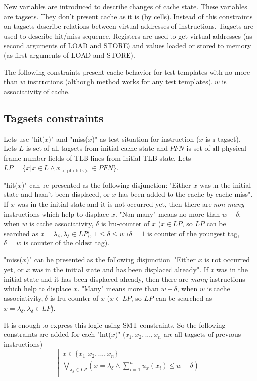 \documentclass[times, 10pt,twocolumn]{article}
\begin{document}
New variables are introduced to describe changes of cache state.
These variables are tagsets. They don't present cache as it is (by
cells). Instead of this constraints on tagsets describe relations
between virtual addresses of instructions. Tagsets are used to
describe hit/miss sequence. Registers are used to get virtual
addresses (as second arguments of LOAD and STORE) and values loaded
or stored to memory (as first arguments of LOAD and STORE).

The following constraints present cache behavior for test templates
with no more than $w$ instructions (although method works for any
test templates). $w$ is associativity of cache.

\subsection{Tagsets constraints}

Lets use "hit($x$)" and "miss($x$)" as test situation for
instruction ($x$ is a tagset). Lets $L$ is set of all tagsets from
initial cache state and $PFN$ is set of all physical frame number
fields of TLB lines from initial TLB state. Lets $LP = \{ x | x \in
L \wedge x_{<\mbox{pfn~bits}>} \in PFN\}$.

"hit($x$)" can be presented as the following disjunction: "Either
$x$ was in the initial state and hasn't been displaced, or $x$ has
been added to the cache by cache miss". If $x$ was in the initial
state and it is not occurred yet, then there are \emph{non many}
instructions which help to displace $x$. "Non many" means no more
than $w-\delta$, when $w$ is cache associativity, $\delta$ is
lru-counter of $x$ ($x \in LP$, so $LP$ can be searched as $x =
\lambda_\delta, \lambda_\delta \in LP$), $1 \leqslant \delta
\leqslant w$ ($\delta=1$ is counter of the youngest tag, $\delta=w$
is counter of the oldest tag).

"miss($x$)" can be presented as the following disjunction: "Either
$x$ is not occurred yet, or $x$ was in the initial state and has
been displaced already". If $x$ was in the initial state and it has
been displaced already, then there are \emph{many} instructions
which help to displace $x$. "Many" means more than $w-\delta$, when
$w$ is cache associativity, $\delta$ is lru-counter of $x$ ($x \in
LP$, so $LP$ can be searched as $x = \lambda_\delta, \lambda_\delta
\in LP$).

It is enough to express this logic using SMT-constraints. So the
following constraints are added for each "hit($x$)" ($x_1, x_2, ...,
x_n$ are all tagsets of previous instructions):
$$\left[\begin{array}{l}
x\in\{x_1, x_2, ..., x_n\}\\
\bigvee\limits_{\lambda_\delta \in LP} (x = \lambda_\delta \wedge
\sum\limits_{i=1}^n u_x(x_i) \leqslant w - \delta)\\
\end{array}\right.$$
\end{document}
